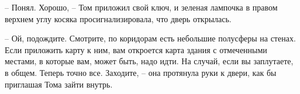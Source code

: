 – Понял. Хорошо, – Том приложил свой ключ, и зеленая лампочка в правом верхнем углу косяка просигнализировала, что дверь открылась. 

– Ой, подождите. Смотрите, по коридорам есть небольшие полусферы на стенах. Если приложить карту к ним, вам откроется карта здания с отмеченными местами, в которые вам, может быть, надо идти. На случай, если вы заплутаете, в общем. Теперь точно все. Заходите, – она протянула руки к двери, как бы приглашая Тома зайти внутрь. 
\clearpage
{\begingroup
{}
\noindent
\endgroup}
\cleardoublepage